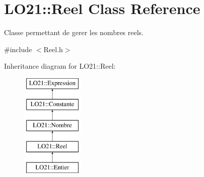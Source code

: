 \hypertarget{class_l_o21_1_1_reel}{\section{\-L\-O21\-:\-:\-Reel \-Class \-Reference}
\label{class_l_o21_1_1_reel}
}


\-Classe permettant de gerer les nombres reels.  




{\ttfamily \#include $<$\-Reel.\-h$>$}

\-Inheritance diagram for \-L\-O21\-:\-:\-Reel\-:\begin{figure}[H]
\begin{center}
\leavevmode
\includegraphics[height=5.000000cm]{class_l_o21_1_1_reel}
\end{center}
\end{figure}
